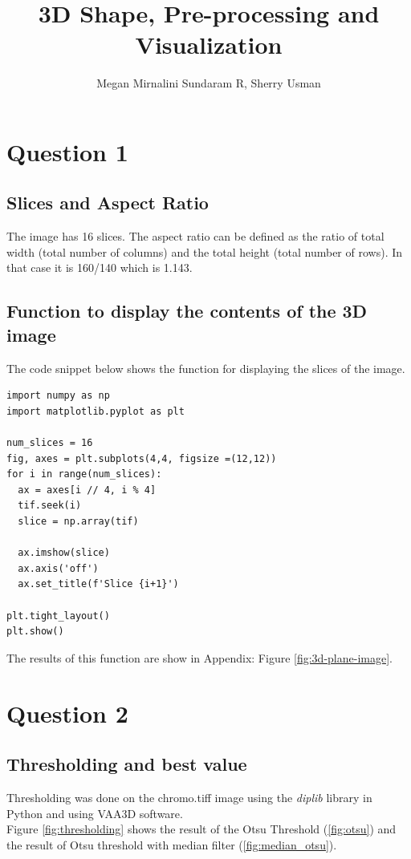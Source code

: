 \documentclass{article}
\title{3D Shape, Pre-processing and Visualization}
\author{Megan Mirnalini Sundaram R, Sherry Usman}
\begin{document}
\maketitle

\section*{Question 1}
\subsection*{Slices and Aspect Ratio}
The image has 16 slices. The aspect ratio can be defined as the ratio of total width (total number of columns) and the total height (total number of rows). In that case it is 160/140 which is 1.143. 

\subsection*{Function to display the contents of the 3D image} \label{sec:contents-3D_image}
The code snippet below shows the function for displaying the slices of the image.  
\begin{lstlisting}
import numpy as np
import matplotlib.pyplot as plt 

num_slices = 16
fig, axes = plt.subplots(4,4, figsize =(12,12))
for i in range(num_slices):
  ax = axes[i // 4, i % 4]
  tif.seek(i)
  slice = np.array(tif)

  ax.imshow(slice)
  ax.axis('off')
  ax.set_title(f'Slice {i+1}')

plt.tight_layout()
plt.show()
\end{lstlisting}
The results of this function are show in Appendix: Figure \ref{fig:3d-plane-image}. 
\clearpage
\section*{Question 2}
\subsection*{Thresholding and best value}
Thresholding was done on the chromo.tiff image using the \textit{diplib} library in Python and using VAA3D software.\\Figure \ref{fig:thresholding} shows the result of the Otsu Threshold (\ref{fig:otsu}) and the result of Otsu threshold with median filter (\ref{fig:median_otsu}). 
\end{document}
